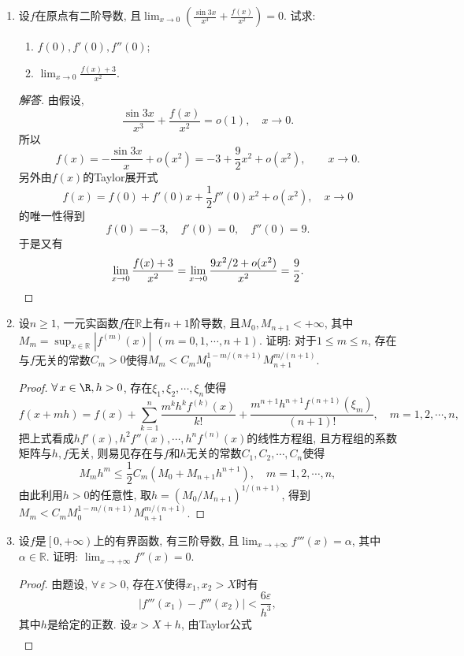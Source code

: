 \begin{6a}
\begin{enumerate}
\begin{proof}[解答]
注：上述答案尚不完整，未考虑到$B=0$的情况。
\end{proof}
\item 设\(f\)在原点有二阶导数, 且\(\lim_{x\rightarrow 0}\left(\frac{\sin 3x}{x^3}+\frac{f(x)}{x^2}\right)=0\). 
试求:\begin{enumerate}[label=(\arabic*)]
\item \(f(0),f'(0),f''(0)\);
\item \(\lim_{x\rightarrow 0}\frac{f(x)+3}{x^2}\).
\end{enumerate}
\begin{proof}[解答]
由假设,\[\frac{\sin3x}{x^3}+\frac{f(x)}{x^2}=o(1),\quad x\rightarrow 0.\]
所以\[f(x)=-\frac{\sin 3x}{x}+o(x^2)=-3+\frac{9}{2}x^2+o(x^2),\qquad x\rightarrow 0.\]
另外由\(f(x)\)的Taylor展开式
\[f(x)=f(0)+f'(0)x+\frac{1}{2}f''(0)x^2+o(x^2),\quad x\rightarrow 0\]
的唯一性得到\[f(0)=-3,\quad f'(0)=0,\quad f''(0)=9.\]
于是又有\[\lim_{x\rightarrow 0}\frac{f(x)+3}{x^2}
=\lim_{x\rightarrow 0}\frac{9x^2/2+o(x^2)}{x^2}=\frac{9}{2}.\qedhere\]
\end{proof}
\item 设\(n\geqslant 1\), 一元实函数\(f\)在\(\mathbb{R}\)上有\(n+1\)阶导数, 
且\(M_0,M_{n+1}<+\infty\), 其中\(M_m=\sup_{x\in\mathbb{R}}|f^{(m)}(x)|\) \((m=0,1,\cdots,n+1)\). 
证明: 对于\(1\leqslant m\leqslant n\), 存在与\(f\)无关的常数\(C_m>0\)使得\(M_m<C_mM_0^{1-m/(n+1)}M_{n+1}^{m/(n+1)}\).
\begin{proof}
\(\forall\,x\in\R,h>0\), 存在\(\xi_1,\xi_2,\cdots,\xi_n\)使得
\[f(x+mh)=f(x)+\sum_{k=1}^{n}\frac{m^kh^kf^{(k)}(x)}{k!}+\frac{m^{n+1}h^{n+1}f^{(n+1)}(\xi_m)}{(n+1)!},\quad m=1,2,\cdots,n,\]
把上式看成\(hf'(x),h^2f''(x),\cdots,h^nf^{(n)}(x)\)的线性方程组, 
且方程组的系数矩阵与\(h,f\)无关,  
则易见存在与\(f\)和\(h\)无关的常数\(C_1,C_2,\cdots,C_n\)使得
\[M_mh^m\leqslant\frac{1}{2}C_m(M_0+M_{n+1}h^{n+1}),\quad m=1,2,\cdots,n,\]
由此利用\(h>0\)的任意性, 取\(h=(M_0/M_{n+1})^{1/(n+1)}\), 
得到\(M_m<C_mM_0^{1-m/(n+1)}M_{n+1}^{m/(n+1)}\).
\end{proof}
\item 设\(f\)是\(\left[0,+\infty\right)\)上的有界函数, 有三阶导数, 
且\(\lim_{x\rightarrow+\infty}f'''(x)=\alpha\), 其中\(\alpha\in\mathbb{R}\). 
证明: \(\lim_{x\rightarrow+\infty}f''(x)=0.\)
\begin{proof}
	由题设, \(\forall\,\varepsilon>0\), 存在\(X\)使得\(x_1,x_2>X\)时有
    \[\left|f'''(x_1)-f'''(x_2)\right|<\frac{6\varepsilon}{h^3},\]
    其中\(h\)是给定的正数. 设\(x>X+h\), 由Taylor公式
    \[\begin{aligned}

\end{aligned}\]
\end{proof}
\end{enumerate}
\end{6a}
